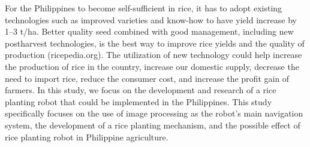 	For the Philippines to become self-sufficient in rice, it has to adopt existing technologies such as improved varieties and know-how to have yield increase by 1–3 t/ha. Better quality seed combined with good management, including new postharvest technologies, is the best way to improve rice yields and the quality of production (ricepedia.org). The utilization of new technology could help increase the production of rice in the country, increase our domestic supply, decrease the need to import rice, reduce the consumer cost, and increase the profit gain of farmers. In this study, we focus on the development and research of a rice planting robot that could be implemented in the Philippines. This study specifically focuses on the use of image processing as the robot’s main navigation system, the development of a rice planting mechanism, and the possible effect of rice planting robot in Philippine agriculture.



